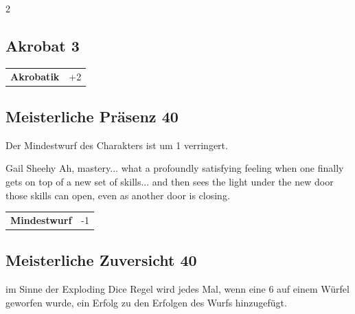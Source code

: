 \begin{multicols}{2}
\begin{tcolorbox}
\end{tcolorbox}

\begin{tcolorbox}
    \subsection*{Akrobat \hfill \small{3 }}
    \tcblower




\begin{tabular}{@{}ll@{}}
    \textbf{Akrobatik} & +2\\
\end{tabular}


\end{tcolorbox}

\begin{tcolorbox}
    \subsection*{Meisterliche Präsenz \hfill \small{40 }}
    \tcblower
Der Mindestwurf des Charakters ist um 1 verringert.

\begin{pquote}{Gail Sheehy}
Ah, mastery... what a profoundly satisfying feeling when one finally gets on top of a new set of skills... and then sees the light under the new door those skills can open, even as another door is closing.
\end{pquote}

\vspace{3mm}

\begin{tabular}{@{}ll@{}}
    \textbf{Mindestwurf} & -1\\
\end{tabular}


\end{tcolorbox}

\begin{tcolorbox}
    \subsection*{Meisterliche Zuversicht \hfill \small{40 }}
    \tcblower
im Sinne der Exploding Dice Regel wird jedes Mal, wenn eine 6 auf einem Würfel geworfen wurde, ein Erfolg zu den Erfolgen des Wurfs hinzugefügt.


\end{tcolorbox}
\end{multicols}
